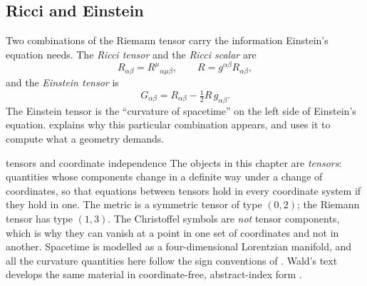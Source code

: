 \subsection{Ricci and Einstein}

Two combinations of the Riemann tensor carry the information Einstein's
equation needs. The \emph{Ricci tensor} and the \emph{Ricci scalar} are
\begin{equation}
  R_{\alpha\beta} = R^{\mu}{}_{\alpha\mu\beta}, \qquad R = g^{\alpha\beta}R_{\alpha\beta},
\end{equation}
and the \emph{Einstein tensor} is
\begin{equation}
  G_{\alpha\beta} = R_{\alpha\beta} - \tfrac{1}{2}R\,g_{\alpha\beta}.
  \label{eq:einstein-tensor}
\end{equation}
The Einstein tensor is the \enquote{curvature of spacetime} on the left side of
Einstein's equation.  explains why this particular
combination appears, and uses it to compute what a geometry demands.

\begin{deeper}{tensors and coordinate independence}
The objects in this chapter are \emph{tensors}: quantities whose components
change in a definite way under a change of coordinates, so that equations
between tensors hold in every coordinate system if they hold in one. The metric
is a symmetric tensor of type $(0,2)$; the Riemann tensor has type $(1,3)$.
The Christoffel symbols are \emph{not} tensor components, which is why they can
vanish at a point in one set of coordinates and not in another. Spacetime is
modelled as a four-dimensional Lorentzian manifold, and all the curvature
quantities here follow the sign conventions of \textcite{Misner1973}. Wald's
text develops the same material in coordinate-free, abstract-index form
\parencite{Wald1984}.
\end{deeper}

